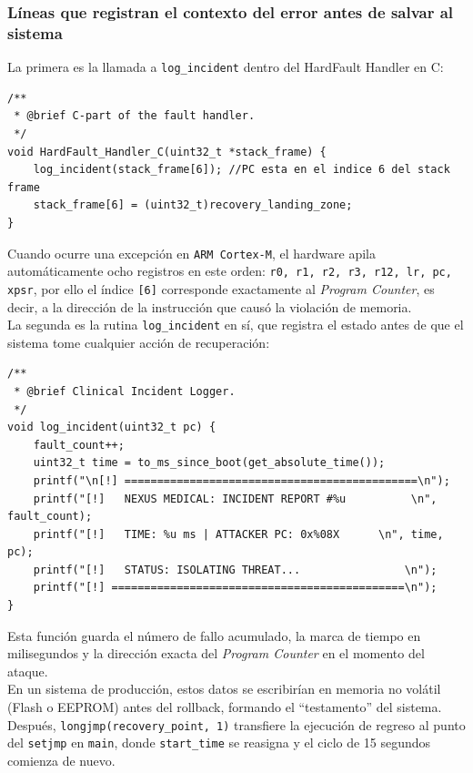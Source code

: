 \documentclass[12pt,letterpaper]{article}
\begin{document}
\subsubsection*{Líneas que registran el contexto del error antes de salvar al sistema}
La primera es la llamada a \texttt{log\_incident} dentro del HardFault Handler en C:
 
\begin{lstlisting}[style=modernc, caption={Captura del \textit{Program Counter} en el handler}]
 /**
 * @brief C-part of the fault handler.
 */
void HardFault_Handler_C(uint32_t *stack_frame) {
    log_incident(stack_frame[6]); //PC esta en el indice 6 del stack frame
    stack_frame[6] = (uint32_t)recovery_landing_zone; 
}
\end{lstlisting}

\bigskip
 
Cuando ocurre una excepción en \texttt{ARM Cortex-M}, el hardware apila automáticamente ocho registros en este
orden: \texttt{r0, r1, r2, r3, r12, lr, pc, xpsr}, por ello el índice \texttt{[6]} corresponde exactamente al
\textit{Program Counter}, es decir, a la dirección de la instrucción que causó la violación de memoria.\\
 
La segunda es la rutina \texttt{log\_incident} en sí, que registra el estado antes de que el sistema tome
cualquier acción de recuperación:
 
\begin{lstlisting}[style=modernc, caption={Registro de telemetría antes del rollback}]
/**
 * @brief Clinical Incident Logger.
 */
void log_incident(uint32_t pc) {
    fault_count++;
    uint32_t time = to_ms_since_boot(get_absolute_time());
    printf("\n[!] =============================================\n");
    printf("[!]   NEXUS MEDICAL: INCIDENT REPORT #%u          \n", fault_count);
    printf("[!]   TIME: %u ms | ATTACKER PC: 0x%08X      \n", time, pc);
    printf("[!]   STATUS: ISOLATING THREAT...                \n");
    printf("[!] =============================================\n");
}
\end{lstlisting}

\bigskip

Esta función guarda el número de fallo acumulado, la marca de tiempo en milisegundos y la dirección exacta del
\textit{Program Counter} en el momento del ataque.\\

En un sistema de producción, estos datos se escribirían en memoria no volátil (Flash o EEPROM) antes del
rollback, formando el ``testamento'' del sistema. Después, \texttt{longjmp(recovery\_point, 1)} transfiere la
ejecución de regreso al punto del \texttt{setjmp} en \texttt{main}, donde \texttt{start\_time} se reasigna y el
ciclo de 15 segundos comienza de nuevo.\\
\end{document}
